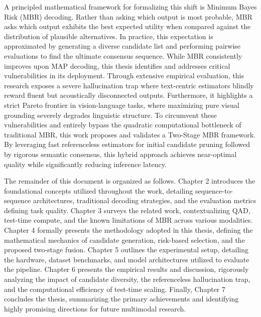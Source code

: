A principled mathematical framework for formalizing this shift is Minimum Bayes Risk (MBR) decoding. Rather than asking which output is most probable, MBR asks which output exhibits the best expected utility when compared against the distribution of plausible alternatives. In practice, this expectation is approximated by generating a diverse candidate list and performing pairwise evaluations to find the ultimate consensus sequence. While MBR consistently improves upon MAP decoding, this thesis identifies and addresses critical vulnerabilities in its deployment. Through extensive empirical evaluation, this research exposes a severe hallucination trap where text-centric estimators blindly reward fluent but acoustically disconnected outputs. Furthermore, it highlights a strict Pareto frontier in vision-language tasks, where maximizing pure visual grounding severely degrades linguistic structure. To circumvent these vulnerabilities and entirely bypass the quadratic computational bottleneck of traditional MBR, this work proposes and validates a Two-Stage MBR framework. By leveraging fast referenceless estimators for initial candidate pruning followed by rigorous semantic consensus, this hybrid approach achieves near-optimal quality while significantly reducing inference latency.

The remainder of this document is organized as follows. Chapter 2 introduces the foundational concepts utilized throughout the work, detailing sequence-to-sequence architectures, traditional decoding strategies, and the evaluation metrics defining task quality. Chapter 3 surveys the related work, contextualizing QAD, test-time compute, and the known limitations of MBR across various modalities. Chapter 4 formally presents the methodology adopted in this thesis, defining the mathematical mechanics of candidate generation, risk-based selection, and the proposed two-stage fusion. Chapter 5 outlines the experimental setup, detailing the hardware, dataset benchmarks, and model architectures utilized to evaluate the pipeline. Chapter 6 presents the empirical results and discussion, rigorously analyzing the impact of candidate diversity, the referenceless hallucination trap, and the computational efficiency of test-time scaling. Finally, Chapter 7 concludes the thesis, summarizing the primary achievements and identifying highly promising directions for future multimodal research.
